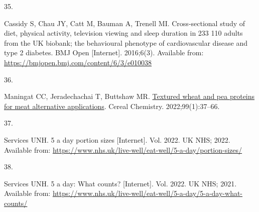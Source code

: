 \documentclass[
  11pt,
  a4paper,
  DIV=11,
  numbers=noendperiod,
  twocolumn]{scrartcl}
\newlength{\cslhangindent}
\newlength{\csllabelwidth}
\newlength{\cslentryspacingunit} %
\newenvironment{CSLReferences}[2] %
 {%
  \setlength{\parindent}{0pt}
  \ifodd #1
  \let\oldpar\par
  \def\par{\hangindent=\cslhangindent\oldpar}
  \fi
  \setlength{\parskip}{#2\cslentryspacingunit}
 }%
 {}
\newcommand{\CSLLeftMargin}[1]{\parbox[t]{\csllabelwidth}{#1}}
\newcommand{\CSLRightInline}[1]{\parbox[t]{\linewidth - \csllabelwidth}{#1}\break}
\begin{document}
\begin{CSLReferences}{0}{0}
\leavevmode{}%
\CSLLeftMargin{35. }%
\CSLRightInline{Cassidy S, Chau JY, Catt M, Bauman A, Trenell MI.
Cross-sectional study of diet, physical activity, television viewing and
sleep duration in 233 110 adults from the UK biobank; the behavioural
phenotype of cardiovascular disease and type 2 diabetes. BMJ Open
{[}Internet{]}. 2016;6(3). Available from:
\url{https://bmjopen.bmj.com/content/6/3/e010038}}

\leavevmode{}%
\CSLLeftMargin{36. }%
\CSLRightInline{Maningat CC, Jeradechachai T, Buttshaw MR.
\href{https://doi.org/10.1002/cche.10503}{Textured wheat and pea
proteins for meat alternative applications}. Cereal Chemistry.
2022;99(1):37--66. }

\leavevmode{}%
\CSLLeftMargin{37. }%
\CSLRightInline{Services UNH. 5 a day portion sizes {[}Internet{]}. Vol.
2022. UK NHS; 2022. Available from:
\url{https://www.nhs.uk/live-well/eat-well/5-a-day/portion-sizes/}}

\leavevmode{}%
\CSLLeftMargin{38. }%
\CSLRightInline{Services UNH. 5 a day: What counts? {[}Internet{]}. Vol.
2022. UK NHS; 2021. Available from:
\url{https://www.nhs.uk/live-well/eat-well/5-a-day/5-a-day-what-counts/}}

\end{CSLReferences}
\end{document}
